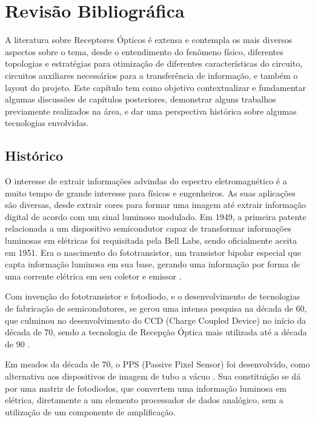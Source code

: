 \chapter[Revisão Bibliográfica]{Revisão Bibliográfica}

A literatura sobre Receptores Ópticos \'e extensa e contempla os mais diversos aspectos sobre o tema, desde o entendimento do fenômeno físico, diferentes topologias e estrat\'egias para otimização de diferentes características do circuito, circuitos auxiliares necessários para a transferência de informação, e tamb\'em o layout do projeto. Este capítulo tem como objetivo contextualizar e fundamentar algumas discussões de capítulos posteriores, demonstrar alguns trabalhos previamente realizados na área, e dar uma perspectiva histórica sobre algumas tecnologias envolvidas.
\section{Histórico}
O interesse de extrair informações advindas do espectro eletromagn\'etico \'e a muito tempo de grande interesse para físicos e engenheiros. As suas aplicações são diversas, desde extrair cores para formar uma imagem at\'e extrair informação digital de acordo com um sinal luminoso modulado.
Em 1949, a primeira patente relacionada a um dispositivo semicondutor capaz de transformar informações luminosas em el\'etricas foi requisitada pela Bell Labs, sendo oficialmente aceita em 1951. Era o nascimento do fototransistor, um transistor bipolar especial que capta informação luminosa em sua base, gerando uma informação por forma de uma corrente el\'etrica em seu coletor e emissor \cite{Shive}.

Com invenção do fototransistor e fotodiodo, e o desenvolvimento de tecnologias de fabricação de semicondutores, se gerou uma intensa pesquisa na d\'ecada de 60, que culminou no desenvolvimento do CCD (Charge Coupled Device) no início da d\'ecada de 70, sendo a tecnologia de Recepção Óptica mais utilizada at\'e a d\'ecada de 90 \cite{EstevaoCoelho, Andre}.

Em meados da d\'ecada de 70, o PPS (Passive Pixel Sensor) foi desenvolvido, como alternativa aos dispositivos de imagem de tubo a vácuo \cite{Savvas}. Sua constituição se dá por uma matriz de fotodiodos, que convertem uma informação luminosa em el\'etrica, diretamente a um elemento processador de dados analógico, sem a utilização de um componente de amplificação.

